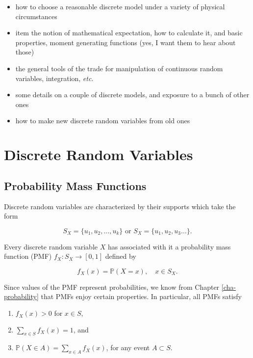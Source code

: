 \documentclass[]{book}
\providecommand{\tightlist}{%
  \setlength{\itemsep}{0pt}\setlength{\parskip}{0pt}}
\numberwithin{equation}{chapter}
\numberwithin{figure}{chapter}
\theoremstyle{plain}
\theoremstyle{definition}
\theoremstyle{remark}
\theoremstyle{definition}
\theoremstyle{definition}
\theoremstyle{remark}
\begin{document}
\begin{itemize}
\tightlist
\item
  how to choose a reasonable discrete model under a variety of physical
  circumstances
\item
  item the notion of mathematical expectation, how to calculate it, and
  basic properties, moment generating functions (yes, I want them to
  hear about those)
\item
  the general tools of the trade for manipulation of continuous random
  variables, integration, \emph{etc}.
\item
  some details on a couple of discrete models, and exposure to a bunch
  of other ones
\item
  how to make new discrete random variables from old ones
\end{itemize}

\section{Discrete Random Variables}\label{sec-discrete-random-variables}

\subsection{Probability Mass
Functions}\label{sub-probability-mass-functions}

Discrete random variables are characterized by their supports which take
the form

\begin{equation}
S_{X}=\{u_{1},u_{2},\ldots,u_{k}\}\mbox{ or }S_{X}=\{u_{1},u_{2},u_{3}\ldots\}.
\end{equation}

Every discrete random variable \(X\) has associated with it a
probability mass function (PMF) \(f_{X}:S_{X}\to[0,1]\) defined by

\begin{equation}
f_{X}(x)=\mathbb{P}(X=x),\quad x\in S_{X}.
\end{equation}

Since values of the PMF represent probabilities, we know from Chapter
\ref{cha-probability} that PMFs enjoy certain properties. In particular,
all PMFs satisfy

\begin{enumerate}
\def\labelenumi{\arabic{enumi}.}
\tightlist
\item
  \(f_{X}(x)>0\) for \(x\in S\),
\item
  \(\sum_{x\in S}f_{X}(x)=1\), and
\item
  \(\mathbb{P}(X\in A)=\sum_{x\in A}f_{X}(x)\), for any event
  \(A\subset S\).
\end{enumerate}
\end{document}
